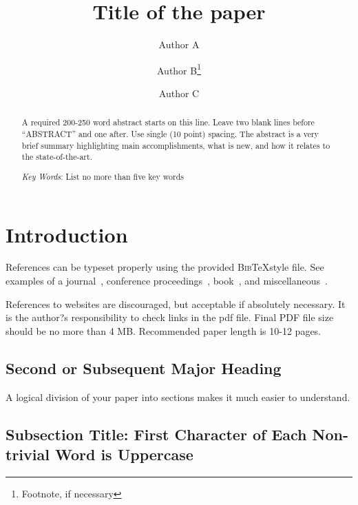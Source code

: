 \documentclass{mc2015}
\begin{document}
\title{Title of the paper}

\author{Author A}
\author{Author B\footnote{Footnote, if necessary}}

\author{Author C}

\maketitle

\begin{abstract}
A required 200-250 word abstract starts on this line.  Leave two blank lines before ``ABSTRACT'' and one after.  
Use single (10 point) spacing.  
The abstract is a very brief summary highlighting main accomplishments, what is new, and how it relates to the state-of-the-art.

\emph{Key Words}: List no more than five key words
\end{abstract}

\section{Introduction}

References can be typeset properly using the provided \textsc{Bib}\TeX style
file. See examples of a journal~\cite{journal}, conference
proceedings~\cite{proceedings}, book~\cite{book}, and
miscellaneous~\cite{misc}.

References to websites are discouraged, but acceptable if absolutely necessary.  It is the author?s responsibility to check links in the pdf file.
Final PDF file size should be no more than 4 MB.  Recommended paper length is 10-12 pages.

\subsection{Second or Subsequent Major Heading}

A logical division of your paper into sections makes it much easier to understand.    

\subsection{Subsection Title: First Character of Each Non-trivial Word is Uppercase}
\end{document}
